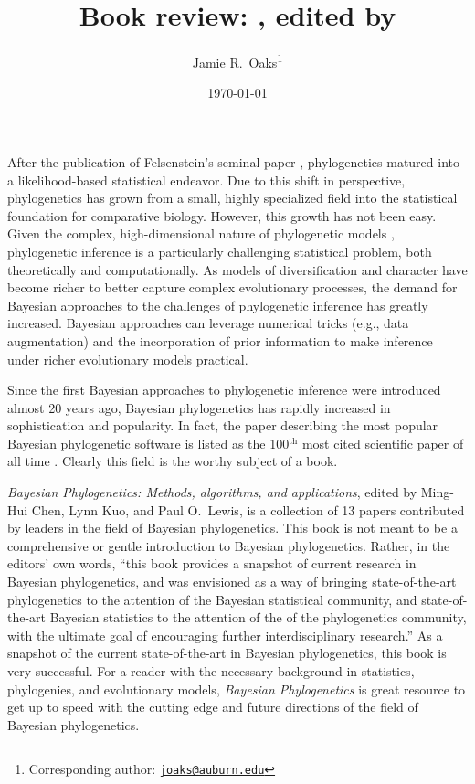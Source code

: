 \documentclass[letterpaper,12pt]{article}
\title{Book review: \bookfulltitle, edited by \editors}
\author[1,2]{Jamie R.\ Oaks\thanks{Corresponding author: \href{mailto:joaks@auburn.edu}{\tt joaks@auburn.edu}}}
\affil[1]{Department of Biology, University of Washington, Seattle, Washington 98195}
\affil[2]{Department of Biological Sciences, Auburn University, Auburn, Alabama 36849}
\date{\today}
\newcommand{\super}[1]{\ensuremath{^{\textrm{#1}}}}
\newcommand{\booktitle}{\textit{Bayesian Phylogenetics}\xspace}
\newcommand{\booksubtitle}{\textit{Methods, algorithms, and applications}\xspace}
\newcommand{\bookfulltitle}{\textit{\booktitle: \booksubtitle}\xspace}
\newcommand{\editors}{Ming-Hui Chen, Lynn Kuo, and Paul O.\ Lewis\xspace}
\begin{document}
\maketitle

\newpage
\doublespacing

After the publication of Felsenstein's seminal paper \citep{Felsenstein1981},
phylogenetics matured into a likelihood-based statistical endeavor.
Due to this shift in perspective, phylogenetics has grown from a small, highly
specialized field 
into the statistical foundation for comparative biology.
However, this growth has not been easy.
Given the complex, high-dimensional nature of phylogenetic models
\citep{Kim2000}, phylogenetic inference is a particularly challenging
statistical problem, both theoretically and computationally. 
As models of diversification and character have become richer to better capture
complex evolutionary processes, the demand for Bayesian approaches to the
challenges of phylogenetic inference has greatly increased.
Bayesian approaches can leverage numerical tricks (e.g., data augmentation) and
the incorporation of prior information to make inference under
richer evolutionary models practical.

Since the first Bayesian approaches to phylogenetic inference were introduced
\citep{Rannala1996,Mau1997} almost 20 years ago, Bayesian phylogenetics has
rapidly increased in sophistication and popularity.
In fact, the paper describing the most popular Bayesian phylogenetic software
\citep{Ronquist2003} is listed as the 100\super{th} most cited scientific paper
of all time \citep{VanNoorden2014}.
Clearly this field is the worthy subject of a book.

\bookfulltitle, edited by \editors \citep{Chen2014}, is a collection of 13
papers contributed by leaders in the field of Bayesian phylogenetics.
This book is not meant to be a comprehensive or gentle introduction to Bayesian
phylogenetics.
Rather, in the editors' own words, ``this book provides a snapshot of current
research in Bayesian phylogenetics, and was envisioned as a way of bringing
state-of-the-art phylogenetics to the attention of the Bayesian statistical
community, and state-of-the-art Bayesian statistics to the attention of the of
the phylogenetics community, with the ultimate goal of encouraging further
interdisciplinary research.''
As a snapshot of the current state-of-the-art in Bayesian phylogenetics, this
book is very successful.
For a reader with the necessary background in statistics, phylogenies, and
evolutionary models, \booktitle is great resource to get up to speed with the
cutting edge and future directions of the field of Bayesian phylogenetics.
\end{document}
